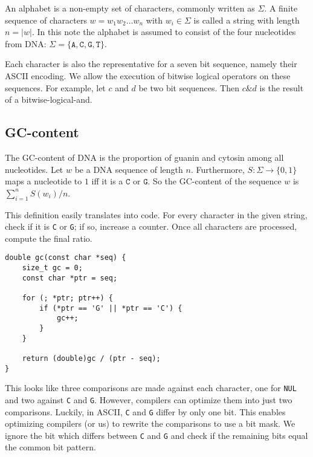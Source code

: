 \documentclass[10pt,letterpaper]{article}
\begin{document}
An alphabet is a non-empty set of characters, commonly written as $\Sigma$. A finite sequence of characters $w = w_1 w_2 \ldots w_n$ with $w_i \in \Sigma$ is called a string with length $n = |w|$. In this note the alphabet is assumed to consist of the four nucleotides from DNA: $\Sigma = \{\texttt{A},\texttt{C},\texttt{G},\texttt{T}\}$.

Each character is also the representative for a seven bit sequence, namely their ASCII encoding. We allow the execution of bitwise logical operators on these sequences. For example, let $c$ and $d$ be two bit sequences. Then $c \mathbin{\&} d$ is the result of a bitwise-logical-and.


\subsection{GC-content}
\label{sec:gccontent}

The GC-content of DNA is the proportion of guanin and cytosin among all nucleotides. Let $w$ be a DNA sequence of length $n$. Furthermore, $S\colon \Sigma \to \{0,1\}$ maps a nucleotide to $1$ iff it is a $\texttt{C}$ or $\texttt{G}$. So the GC-content of the sequence $w$ is $\sum_{i=1}^n S(w_i) / n$.

This definition easily translates into code. For every character in the given string, check if it is \texttt{C} or \texttt{G}; if so, increase a counter. Once all characters are processed, compute the final ratio.


\lstset{style=algo}

\begin{lstlisting}
double gc(const char *seq) {  
    size_t gc = 0;
    const char *ptr = seq;

    for (; *ptr; ptr++) {
        if (*ptr == 'G' || *ptr == 'C') {
            gc++;
        }
    }

    return (double)gc / (ptr - seq);
}
\end{lstlisting}

This looks like three comparisons are made against each character, one for \texttt{NUL} and two against \texttt{C} and \texttt{G}. However, compilers can optimize them into just two comparisons. Luckily, in ASCII, \texttt{C} and \texttt{G} differ by only one bit. This enables optimizing compilers (or us) to rewrite the comparisons to use a bit mask. We ignore the bit which differs between \texttt{C} and \texttt{G} and check if the remaining bits equal the common bit pattern.
\end{document}
